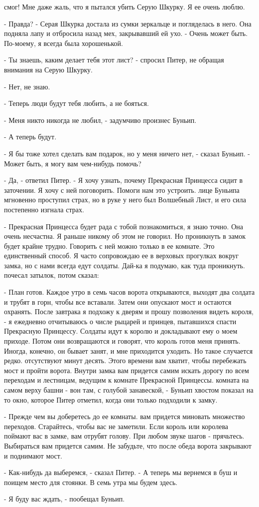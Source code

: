 смог! Мне даже жаль, что я пытался убить Серую Шкурку. Я ее очень 
люблю.
\par- Правда? - Серая Шкурка достала из сумки зеркальце и погляделась 
в него. Она подняла лапу и отбросила назад мех, закрывавший ей ухо. - 
Очень может быть. По-моему, я всегда была хорошенькой.
\par- Ты знаешь, каким делает тебя этот лист? - спросил Питер, не 
обращая внимания на Серую Шкурку.
\par- Нет, не знаю.
\par- Теперь люди будут тебя любить, а не бояться.
\par- Меня никто никогда не любил, - задумчиво произнес Буньип.
\par- А теперь будут.
\par- Я бы тоже хотел сделать вам подарок, но у меня ничего нет, - 
сказал Буньип. - Может быть, я могу вам чем-нибудь помочь?
\par- Да, - ответил Питер. - Я хочу узнать, почему Прекрасная 
Принцесса сидит в заточении. Я хочу с ней поговорить. Помоги нам это 
устроить.
 лице Буньипа мгновенно проступил страх, но в руке у него был 
Волшебный Лист, и его сила постепенно изгнала страх.
\par- Прекрасная Принцесса будет рада с тобой познакомиться, я знаю 
точно. Она очень несчастна. Я раньше никому об этом не говорил. Но 
проникнуть в замок будет крайне трудно. Говорить с ней можно только в 
ее комнате. Это единственный способ. Я часто сопровождаю ее в верховых 
прогулках вокруг замка, но с нами всегда едут солдаты. Дай-ка я 
подумаю, как туда проникнуть.
 почесал затылок, потом сказал:
\par- План готов. Каждое утро в семь часов ворота открываются, выходят 
два солдата и трубят в горн, чтобы все вставали. Затем они опускают 
мост и остаются охранять. После завтрака я подхожу к дверям и прошу 
позволения видеть короля, - я ежедневно отчитываюсь о числе рыцарей и 
принцев, пытавшихся спасти Прекрасную Принцессу. Солдаты идут к королю 
и докладывают ему о моем приходе. Потом они возвращаются и говорят, 
что король готов меня принять. Иногда, конечно, он бывает занят, и мне 
приходится уходить. Но такое случается редко.
 отсутствуют минут десять. Этого времени вам хватит, чтобы 
перебежать мост и пройти ворота. Внутри замка вам придется самим 
искать дорогу по всем переходам и лестницам, ведущим к комнате 
Прекрасной Принцессы.
 комната на самом верху башни - вон там, с голубой занавеской, - 
Буньип хвостом показал на то окно, которое Питер отметил, когда они 
только подходили к замку.
\par- Прежде чем вы доберетесь до ее комнаты. вам придется миновать 
множество переходов. Старайтесь, чтобы вас не заметили. Если король 
или королева поймают вас в замке, вам отрубят голову. При любом звуке 
шагов - прячьтесь. Выбираться вам придется самим. Не забудьте, что 
после обеда ворота закрывают и поднимают мост.
\par- Как-нибудь да выберемся, - сказал Питер. - А теперь мы вернемся 
в буш и поищем место для стоянки. В семь утра мы будем здесь.
\par- Я буду вас ждать, - пообещал Буньип.
